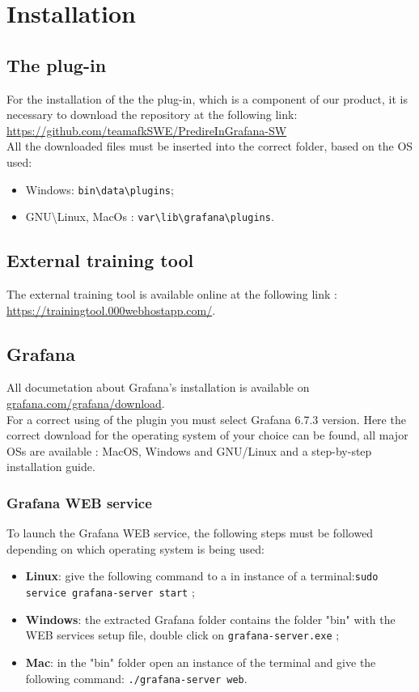 \section{Installation}
\subsection{The plug-in}
For the installation of the the plug-in, which is a component of our product,  it is necessary to download the repository at the following link:\\ \url{https://github.com/teamafkSWE/PredireInGrafana-SW}\\
All the downloaded files must be inserted into the correct folder, based on the OS used:
\begin{itemize} 
\item Windows: \texttt{bin\textbackslash data\textbackslash plugins};
\item GNU\textbackslash Linux, MacOs : \texttt{var\textbackslash lib\textbackslash grafana\textbackslash plugins}.
\end{itemize}

\subsection{External training tool}
The external training tool is available online at the following link : \url{https://trainingtool.000webhostapp.com/}.\\

\subsection{Grafana}
All documetation about Grafana's installation is available on  \url{grafana.com/grafana/download}.\\For a correct using of the plugin you must select Grafana 6.7.3 version.
Here the correct download for the operating system of your choice can be found, all major OSs are available : MacOS, Windows and GNU\slash Linux and a step-by-step installation guide.
\subsubsection{Grafana WEB service}

To launch the Grafana WEB service, the following steps must be followed depending on which operating system is being used:

\begin{itemize}
\item\textbf{Linux}: give the following command to a in instance of a terminal:\texttt{sudo service grafana-server start} ;
\item\textbf{Windows}: the extracted Grafana folder contains the folder "bin" with the WEB services setup file, double click on \texttt{grafana-server.exe} ;
\item\textbf{Mac}: in the "bin" folder open an instance of the  terminal and give the following command: \texttt{./grafana-server web}.
\end{itemize}

